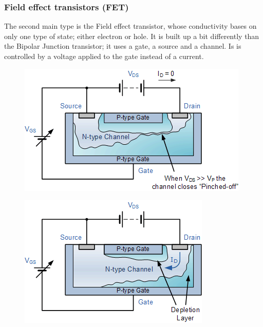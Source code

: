 \documentclass[11pt]{article}
\begin{document}
\subsubsection{Field effect transistors (FET)}
The second main type is the Field effect transistor, whose conductivity bases on only one type of state; either electron or hole. It is built up a bit differently than the Bipolar Junction transistor; it uses a gate, a source and a channel. Is is controlled by a voltage applied to the gate instead of a current.
\begin{figure}[H]
\centering
\begin{minipage}{.6\textwidth}
  \includegraphics[width=1\linewidth]{jfet_closed}
  \label{fig:jfet_closed}
\end{minipage}%
\begin{minipage}{0.6\textwidth}
  \includegraphics[width=.8\linewidth]{jfet_open}
  \label{fig:jfet_open}
\end{minipage}%
\end{figure}
\end{document}
